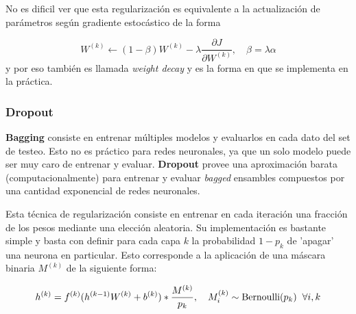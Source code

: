 No es dificil ver que esta regularización es equivalente a la actualización de parámetros según gradiente estocástico de la forma 

\begin{equation*}
W^{(k)} \gets (1-\beta) W^{(k)} - \lambda \frac{\partial J}{\partial W^{(k)}}, \quad \beta = \lambda \alpha
\end{equation*}
y por eso también es llamada \textit{weight decay} y es la forma en que se implementa en la práctica. 

\subsubsection{Dropout}

\textbf{Bagging} consiste en entrenar m\'ultiples modelos y evaluarlos en cada dato del set de testeo. Esto no es pr\'actico para redes neuronales, ya que un solo modelo puede ser muy caro de entrenar y evaluar. \textbf{Dropout} provee una aproximaci\'on barata (computacionalmente) para entrenar y evaluar \textit{bagged} ensambles compuestos por una cantidad exponencial de redes neuronales.

Esta técnica de regularización consiste en entrenar en cada iteración una fracción de los pesos mediante una elección aleatoria. Su implementación es bastante simple y basta con definir para cada capa $k$ la probabilidad $1-p_k$ de 'apagar' una neurona en particular. Esto corresponde a la aplicación de una máscara binaria $M^{(k)}$ de la siguiente forma:

\begin{equation}
h^{(k)} = f^{(k)}(h^{(k-1)}W^{(k)} + b^{(k)}) *  \frac{M^{(k)}}{p_k}, \quad M^{(k)}_i \sim \text{Bernoulli}(p_k) \hspace{0.2cm} \forall i,k
\end{equation}

